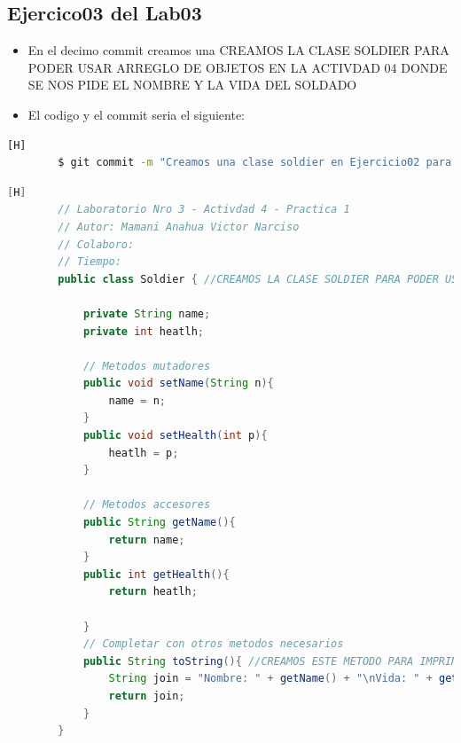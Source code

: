 \documentclass{article}
\begin{document}
	\subsection{Ejercico03 del Lab03}
	\begin{itemize}	
		\item En el decimo commit creamos una CREAMOS LA CLASE SOLDIER PARA PODER USAR ARREGLO DE OBJETOS EN LA ACTIVDAD 04 DONDE SE NOS PIDE EL NOMBRE Y LA VIDA DEL SOLDADO
		\item El codigo y el commit seria el siguiente:
	\end{itemize}
	\begin{lstlisting}[language=bash,caption={Commit}][H]
		$ git commit -m "Creamos una clase soldier en Ejercicio02 para poder usarla en la actividad04 del lab01 ya que nos pide usar arreglo de objetos donde cada soldado se le pide su nombre y su vida , tambien movimos los archivos DemoBatalla.java y Nave.java a una nueva carpeta"
	\end{lstlisting}
	\begin{lstlisting}[language=java,caption={Las lineas de codigo de lo creado:}][H]
		// Laboratorio Nro 3 - Activdad 4 - Practica 1
		// Autor: Mamani Anahua Victor Narciso
		// Colaboro:
		// Tiempo:
		public class Soldier { //CREAMOS LA CLASE SOLDIER PARA PODER USAR ARREGLO DE OBJETOS EN LA ACTIVDAD 04 DONDE SE NOS PIDE EL NOMBRE Y LA VIDA DEL SOLDADO  
		
			private String name;
			private int heatlh;
		
			// Metodos mutadores
			public void setName(String n){
				name = n;
			}
			public void setHealth(int p){
				heatlh = p;
			}
		
			// Metodos accesores
			public String getName(){
				return name;
			}
			public int getHealth(){
				return heatlh;
		
			}
			// Completar con otros metodos necesarios
			public String toString(){ //CREAMOS ESTE METODO PARA IMPRIMIR LOS DATOS DEl OBJETO
				String join = "Nombre: " + getName() + "\nVida: " + getHealth();
				return join;
			}
		}
	\end{lstlisting}
\end{document}
